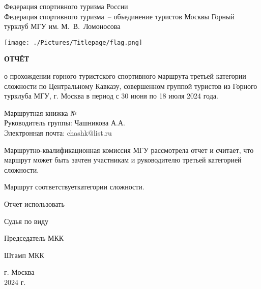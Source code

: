\begin{titlepage}
    \begin{center}
        {\large
            Федерация спортивного туризма России\\
            Федерация спортивного туризма~-- объединение туристов Москвы Горный турклуб МГУ им. М.~В.~Ломоносова
        }
        \vspace{0.7cm}
        
        \texttt{[image: ./Pictures/Titlepage/flag.png]}

        \vspace{0.7cm}
        {\Huge\textbf{ОТЧЁТ}}

        \vspace{0.7cm}
        \parbox{14cm}{\centering
            о прохождении горного туристского спортивного маршрута третьей категории сложности
            по Центральному Кавказу, совершенном группой туристов из Горного турклуба МГУ, г. Москва
            в период с 30 июня по 18 июля 2024 года.
        }

        \vspace{1.0cm}
        \hfill\parbox{8.7cm}{\small
            Маршрутная книжка №\\
            Руководитель группы: Чашникова А.А.\\
            Электронная почта: chashk@list.ru
        }

        \vspace{1.0cm}
        \parbox{\textwidth}{
            Маршрутно-квалификационная комиссия МГУ рассмотрела отчет и считает,
            что маршрут может быть зачтен участникам и руководителю третьей категорией сложности.
        }
    \end{center}

    \vspace{0.5cm}
    \parbox{15cm}{
        \vspace{0.3cm}
        Маршрут соответствует\hrulefill категории сложности.

        \vspace{0.3cm}
        Отчет использовать\quad\hrulefill \strut

        \vspace{0.3cm}
        Судья по виду\qquad\quad\hrulefill \strut

        \vspace{0.3cm}
        Председатель МКК\quad\hrulefill \strut

        \vspace{0.5cm}
        Штамп МКК
    }\hfill

    \begin{center}
        \vspace{1.0cm}
        {\small г. Москва \\
        2024 г.}
    \end{center}
\end{titlepage}